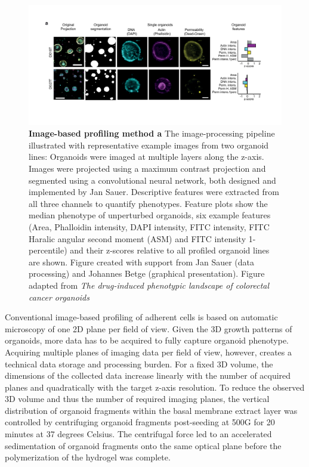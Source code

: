 \begin{flushleft}
\begin{figure}[h]
\centering
\includegraphics[width=\textwidth,
                height=\textheight,
                keepaspectratio]{figures/promise/pdf/fig_1_2.pdf}
\caption{\textbf{Image-based profiling method a} The image-processing pipeline illustrated with representative example images from two organoid lines: Organoids were imaged at multiple layers along the z-axis. Images were projected using a maximum contrast projection and segmented using a convolutional neural network, both designed and implemented by Jan Sauer. Descriptive features were extracted from all three channels to quantify phenotypes. Feature plots show the median phenotype of unperturbed organoids, six example features (Area, Phalloidin intensity, DAPI intensity, FITC intensity, FITC Haralic angular second moment (ASM) and FITC intensity 1-percentile) and their z-scores relative to all profiled organoid lines are shown. Figure created with support from Jan Sauer (data processing) and Johannes Betge (graphical presentation). Figure adapted from \textit{The drug-induced phenotypic landscape of colorectal cancer organoids} \cite{Betge2022-kr}}
\label{fig_135}
\end{figure}

\bigbreak

Conventional image-based profiling of adherent cells is based on automatic microscopy of one 2D plane per field of view. Given the 3D growth patterns of organoids, more data has to be acquired to fully capture organoid phenotype. Acquiring multiple planes of imaging data per field of view, however, creates a technical data storage and processing burden. For a fixed 3D volume, the dimensions of the collected data increase linearly with the number of acquired planes and quadratically with the target z-axis resolution. To reduce the observed 3D volume and thus the number of required imaging planes, the vertical distribution of organoid fragments within the basal membrane extract layer was controlled by centrifuging organoid fragments post-seeding at 500G for 20 minutes at 37 degrees Celsius. The centrifugal force led to an accelerated sedimentation of organoid fragments onto the same optical plane before the polymerization of the hydrogel was complete.


\end{flushleft}
